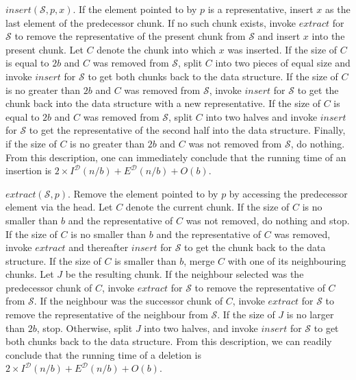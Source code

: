 \documentclass{DIKU-article}
\newcommand{\Insert}{\mbox{$\mathit{insert}$}}
\newcommand{\Extract}{\mbox{$\mathit{extract}$}}
\begin{document}
\Insert{}$(\mathcal{S}, p, x)$. If the element pointed to by $p$ is a
representative, insert $x$ as the last element of the predecessor
chunk. If no such chunk exists, invoke \Extract{} for $\mathcal{S}$
to remove the representative of the present chunk from $\mathcal{S}$
and insert $x$ into the present chunk. Let $C$ denote the chunk into
which $x$ was inserted.
  If the size of $C$ is equal to $2b$ and  $C$ was
removed from $\mathcal{S}$, split $C$ into two pieces of equal size
and invoke \Insert{} for $\mathcal{S}$ to get both chunks back to the
data structure.
  If the size of $C$ is no greater than $2b$
and  $C$ was removed from $\mathcal{S}$, invoke \Insert{} for
$\mathcal{S}$ to get the chunk back into the data structure with a new
representative. 
  If the size of $C$ is equal to $2b$ and $C$ was removed from
$\mathcal{S}$, split $C$ into two halves and invoke \Insert{} for
$\mathcal{S}$ to get the representative of the second half into the
data structure.
  Finally, if the size of $C$ is no greater than $2b$ and $C$ was not removed
from $\mathcal{S}$, do nothing.
{}From this description, one can immediately conclude that the
running time of an insertion is 
$2\times I^{\mathcal{D}}(n/b) + E^{\mathcal{D}}(n/b) + O(b)$.

\Extract{}$(\mathcal{S}, p)$. Remove the element pointed to by $p$ by
accessing the predecessor element via the head. 
Let $C$ denote the current chunk.
  If the size of $C$ is no smaller than $b$ and the representative of
$C$ was not
removed, do nothing and stop. 
  If the size of $C$ is no smaller than $b$ and the representative of
$C$ was removed, invoke \Extract{} and thereafter
\Insert{} for $\mathcal{S}$ to get the chunk back to the data structure.
  If the size of $C$ is smaller than $b$, merge $C$ with one of its
neighbouring chunks. Let $J$ be the resulting chunk. If the neighbour
selected was the predecessor chunk of $C$, invoke \Extract{} for
$\mathcal{S}$ to remove the representative of $C$ from $\mathcal{S}$.
If the neighbour was the successor chunk of $C$, invoke \Extract{} for
$\mathcal{S}$ to remove the representative of the neighbour from
$\mathcal{S}$. If the size of $J$ is
no larger than $2b$, stop. Otherwise, split $J$ into two halves, and
invoke \Insert{} for $\mathcal{S}$ to get both chunks back to the data structure.
From this description, we can readily conclude that the running time
of a deletion is 
$2\times I^{\mathcal{D}}(n/b) + E^{\mathcal{D}}(n/b) + O(b)$.
\end{document}
